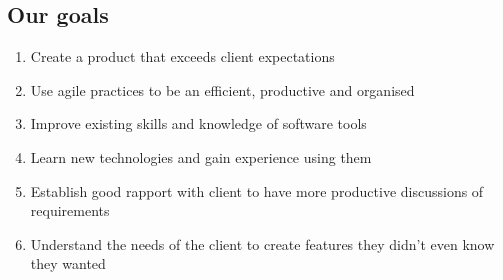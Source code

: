 \documentclass[12pt]{scrreprt}
\begin{document}

\subsection{Our goals}
\begin{enumerate}
	\item Create a product that exceeds client expectations
	\item Use agile practices to be an efficient, productive and organised
	\item Improve existing skills and knowledge of software tools
	\item Learn new technologies and gain experience using them
	\item Establish good rapport with client to have more productive discussions of requirements
	\item Understand the needs of the client to create features they didn't even know they wanted
\end{enumerate}
\end{document}
